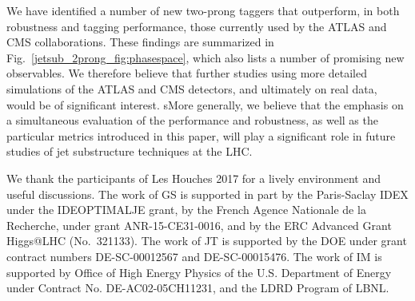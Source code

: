\documentclass[11pt,letterpaper]{article}
\begin{document}
We have identified a  number of new two-prong taggers that outperform, in both robustness and tagging performance, those currently used by the ATLAS and CMS collaborations.
%
These findings are summarized in Fig.~\ref{jetsub_2prong_fig:phasespace}, which also lists a number of promising new observables.
%
We therefore believe that further studies using more detailed simulations of the ATLAS and CMS detectors, and ultimately on real data, would be of significant interest.
%
sMore generally, we believe that the emphasis on a simultaneous evaluation of the performance and robustness, as well as the particular metrics introduced in this paper, will play a significant role in future studies of jet substructure techniques at the LHC.

\begin{acknowledgments}

We thank the participants of Les Houches 2017 for a lively environment and useful discussions. The work of GS is supported in part by the Paris-Saclay IDEX under the
IDEOPTIMALJE grant, by the French Agence Nationale de la Recherche,
under grant ANR-15-CE31-0016, and by the ERC Advanced Grant Higgs@LHC
(No.\ 321133).
%
The work of JT is supported by the DOE under grant contract numbers DE-SC-00012567 and DE-SC-00015476.
%
The work of IM is supported by Office of High Energy Physics of the U.S. Department of Energy under Contract No. DE-AC02-05CH11231, and the LDRD Program of LBNL.


\end{acknowledgments}




\end{document}

